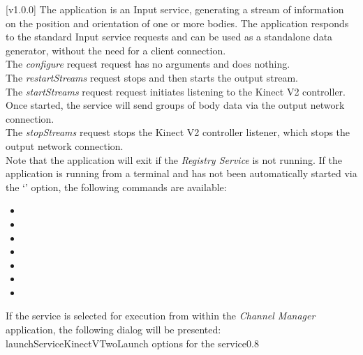 [v1.0.0]
The  application is an Input service,
generating a stream of information on the position and orientation of one or more bodies.
The application responds to the standard Input service requests and can be used as a
standalone data generator, without the need for a client connection.\\

The \emph{configure} request request has no arguments and does nothing.\\

The \emph{restartStreams} request stops and then starts the output stream.\\

The \emph{startStreams} request request initiates listening to the Kinect V2 controller.
Once started, the service will send groups of body data via the output \yarp{} network
connection.\\

The \emph{stopStreams} request stops the Kinect V2 controller listener, which stops the
output \yarp{} network connection.\\ 

Note that the application will exit if the \emph{Registry Service} is not running.
\insertAppParameters
\insertTagDescription{\KVtwoI}
\insertInputServiceComment
\condPage{}
If the application is running from a terminal and has not been automatically started via
the `' option, the following commands are available:
\begin{itemize}
\item{}
\item\exSp{}
\item\exSp{}
\item\exSp{}
\item\exSp{}
\item\exSp{}
\item\exSp{}
\end{itemize}
\secondaryEnd
\condPage
{}
If the service is selected for execution from within the \emph{Channel Manager}
application, the following dialog will be presented:
%
{launchServiceKinectVTwo}{Launch options for the \KVtwoI{} service}{0.8}

